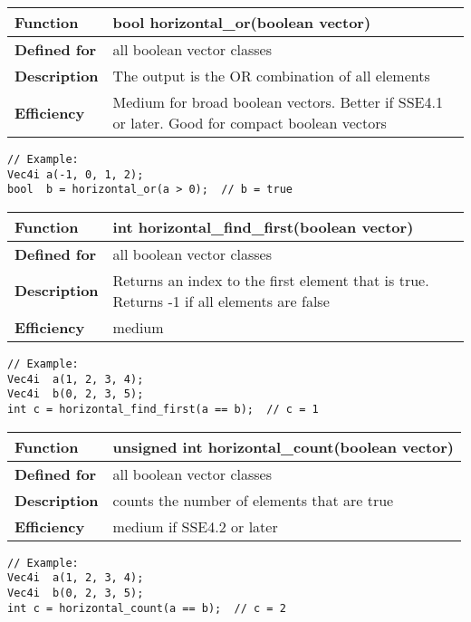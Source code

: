 \documentclass[vcl_manual.tex]{subfiles}
\begin{document}
\begin{tabular}{|p{30mm}|p{120mm}|}
\hline
\bfseries Function & bool horizontal\_or(boolean vector) \\ \hline
\bfseries Defined for & all boolean vector classes \\ \hline
\bfseries Description & The output is the OR combination of all elements \\ \hline
\bfseries Efficiency & Medium for broad boolean vectors. Better if SSE4.1 or later. Good for compact boolean vectors \\ \hline
\end{tabular}
\begin{lstlisting}[frame=none]
// Example:
Vec4i a(-1, 0, 1, 2);
bool  b = horizontal_or(a > 0);  // b = true
\end{lstlisting}


\begin{tabular}{|p{30mm}|p{120mm}|}
\hline
\bfseries Function & int horizontal\_find\_first(boolean vector) \\ \hline
\bfseries Defined for & all boolean vector classes \\ \hline
\bfseries Description & Returns an index to the first element that is true.
Returns -1 if all elements are false \\ \hline
\bfseries Efficiency & medium \\ \hline
\end{tabular}
\begin{lstlisting}[frame=none]
// Example:
Vec4i  a(1, 2, 3, 4);
Vec4i  b(0, 2, 3, 5);
int c = horizontal_find_first(a == b);  // c = 1
\end{lstlisting}


\begin{tabular}{|p{30mm}|p{120mm}|}
\hline
\bfseries Function & unsigned int horizontal\_count(boolean vector) \\ \hline
\bfseries Defined for & all boolean vector classes \\ \hline
\bfseries Description & counts the number of elements that are true \\ \hline
\bfseries Efficiency & medium if SSE4.2 or later \\ \hline
\end{tabular}
\begin{lstlisting}[frame=none]
// Example:
Vec4i  a(1, 2, 3, 4);
Vec4i  b(0, 2, 3, 5);
int c = horizontal_count(a == b);  // c = 2
\end{lstlisting}
\end{document}
